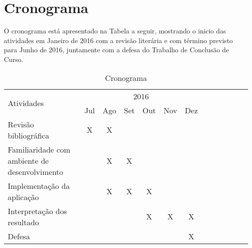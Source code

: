 \chapter{Cronograma}

\indent O cronograma está apresentado na Tabela a seguir, mostrando o inicio das atividades em Janeiro de 2016 com 
a revisão literária e com término previsto para Junho de 2016, juntamente com a defesa do Trabalho de Conclusão de Curso. 


\begin{table}[h!]
\centering
\caption{Cronograma}
\begin{tabular}{|l|c|c|c|c|c|c|c|c|c|c|c|c|}
\hline
 \multirow{2}{*}{Atividades} & \multicolumn{6}{|c|}{2016} \\ \cline{2-7}
 & Jul & Ago & Set & Out & Nov & Dez  \\ \hline
Revisão bibliográfica & X & X &  &  &  &    \\ \hline
Familiaridade com ambiente de desenvolvimento &  & X & X &  &  &   \\ \hline
Implementação da aplicação &  & X & X & X &  &   \\ \hline
Interpretação dos resultado &  &  &  & X & X & X  \\ \hline 
Defesa &  &  &  &  &  & X  \\ \hline
 
\end{tabular}
\end{table}
